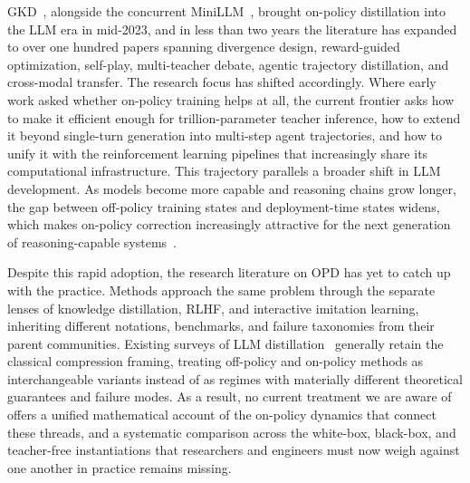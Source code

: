 \documentclass{article} %
\begin{document}
GKD~\citep{2306.13649}, alongside the concurrent MiniLLM~\citep{2306.08543}, brought on-policy distillation into the LLM era in mid-2023, and in less than two years the literature has expanded to over one hundred papers spanning divergence design, reward-guided optimization, self-play, multi-teacher debate, agentic trajectory distillation, and cross-modal transfer. The research focus has shifted accordingly. Where early work asked whether on-policy training helps at all, the current frontier asks how to make it efficient enough for trillion-parameter teacher inference, how to extend it beyond single-turn generation into multi-step agent trajectories, and how to unify it with the reinforcement learning pipelines that increasingly share its computational infrastructure. This trajectory parallels a broader shift in LLM development. As models become more capable and reasoning chains grow longer, the gap between off-policy training states and deployment-time states widens, which makes on-policy correction increasingly attractive for the next generation of reasoning-capable systems~\citep{2603.25562,deepseekv4}.

Despite this rapid adoption, the research literature on OPD has yet to catch up with the practice. Methods approach the same problem through the separate lenses of knowledge distillation, RLHF, and interactive imitation learning, inheriting different notations, benchmarks, and failure taxonomies from their parent communities. Existing surveys of LLM distillation~\citep{2402.13116} generally retain the classical compression framing, treating off-policy and on-policy methods as interchangeable variants instead of as regimes with materially different theoretical guarantees and failure modes. As a result, no current treatment we are aware of offers a unified mathematical account of the on-policy dynamics that connect these threads, and a systematic comparison across the white-box, black-box, and teacher-free instantiations that researchers and engineers must now weigh against one another in practice remains missing.
\end{document}

